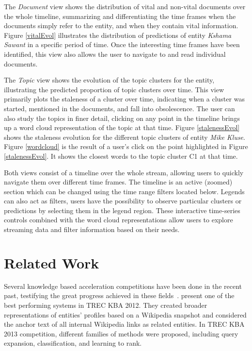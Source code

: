 \documentclass{article}
\begin{document}
The \emph{Document} view shows the distribution of vital and non-vital documents over the whole timeline, summarizing and differentiating the time frames when the documents simply refer to the entity, and when they contain vital information.
Figure \ref{vitalEvol} illustrates the distribution of predictions of entity \emph{Kshama Sawant} in a specific period of time. %
Once the interesting time frames have been identified, this view also allows the user to navigate to and read individual documents. 

The \emph{Topic} view shows the evolution of the topic clusters for the entity, illustrating the predicted proportion of topic clusters over time.
This view primarily plots the staleness of a cluster over time, indicating when a cluster was started, mentioned in the documents, and fall into obsolescence. 
The user can also study the topics in finer detail, clicking on any point in the timeline brings up a word cloud representation of the topic at that time.
Figure \ref{stalenessEvol} shows the staleness evolution for the different topic clusters of entity \emph{Mike Kluse}. 
Figure \ref{wordcloud} is the result of a user's click on the point highlighted in Figure \ref{stalenessEvol}. 
It shows the closest words to the topic cluster C1 at that time.

Both views consist of a timeline over the whole stream, allowing users to quickly navigate them over different time frames.
The timeline is an active (zoomed) section which can be changed using the time range filters located below. Legends can also act as filters, users have the possibility to observe particular clusters or predictions by selecting them in the legend region.
These interactive time-series controls combined with the word cloud representations allow users to explore streaming data and filter information based on their needs.

\section{Related Work}
\label{related}

Several knowledge based acceleration competitions have been done in the recent past, testifying the great progress achieved in these fields~\cite{gross_doucet_toivonen_trec12}. 
\citet{xitong12} present one of the best performing systems in TREC KBA 2012. 
They created broader representations of entities' profiles based on a Wikipedia snapshot and considered the anchor text of all internal Wikipedia links as related entities. In TREC KBA 2013 competition, different families of methods were proposed, including query expansion, classification, and learning to rank. 
\end{document}
